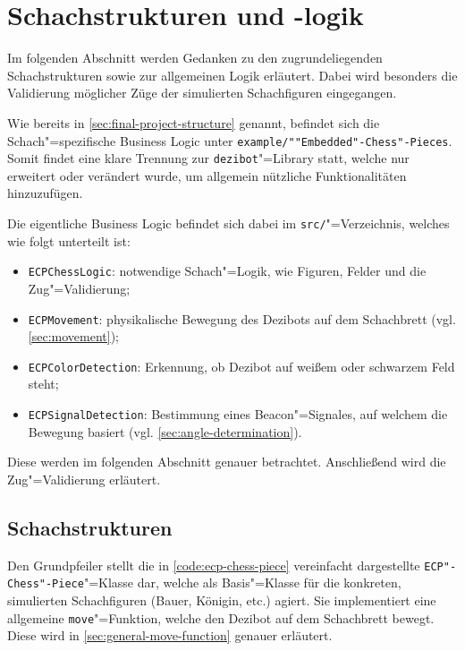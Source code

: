 
\section{Schachstrukturen und -logik}
\label{sec:chess-logic}

Im folgenden Abschnitt werden Gedanken zu den zugrundeliegenden Schachstrukturen sowie zur allgemeinen Logik erläutert. Dabei wird besonders die Validierung möglicher Züge der simulierten Schachfiguren eingegangen.

Wie bereits in \autoref{sec:final-project-structure} genannt, befindet sich die Schach"=spezifische Business Logic unter \texttt{example/""Embedded"-Chess"-Pieces}. Somit findet eine klare Trennung zur \texttt{dezibot}"=Library statt, welche nur erweitert oder verändert wurde, um allgemein nützliche Funktionalitäten hinzuzufügen.

Die eigentliche Business Logic befindet sich dabei im \texttt{src/}"=Verzeichnis, welches wie folgt unterteilt ist:

\begin{itemize}
    \item \texttt{ECPChessLogic}: notwendige Schach"=Logik, wie Figuren, Felder und die Zug"=Validierung;
    \item \texttt{ECPMovement}: physikalische Bewegung des Dezibots auf dem Schachbrett (vgl. \autoref{sec:movement});
    \item \texttt{ECPColorDetection}: Erkennung, ob Dezibot auf weißem oder schwarzem Feld steht;
    \item \texttt{ECPSignalDetection}: Bestimmung eines Beacon"=Signales, auf welchem die Bewegung basiert (vgl. \autoref{sec:angle-determination}).
\end{itemize}

Diese werden im folgenden Abschnitt genauer betrachtet. Anschließend wird die Zug"=Validierung erläutert.


\subsection{Schachstrukturen}


Den Grundpfeiler stellt die in \autoref{code:ecp-chess-piece} vereinfacht dargestellte \texttt{ECP"-Chess"-Piece}"=Klasse dar, welche als Basis"=Klasse für die konkreten, simulierten Schachfiguren (Bauer, Königin, etc.) agiert. Sie implementiert eine allgemeine \texttt{move}"=Funktion, welche den Dezibot auf dem Schachbrett bewegt. Diese wird in \autoref{sec:general-move-function} genauer erläutert.

